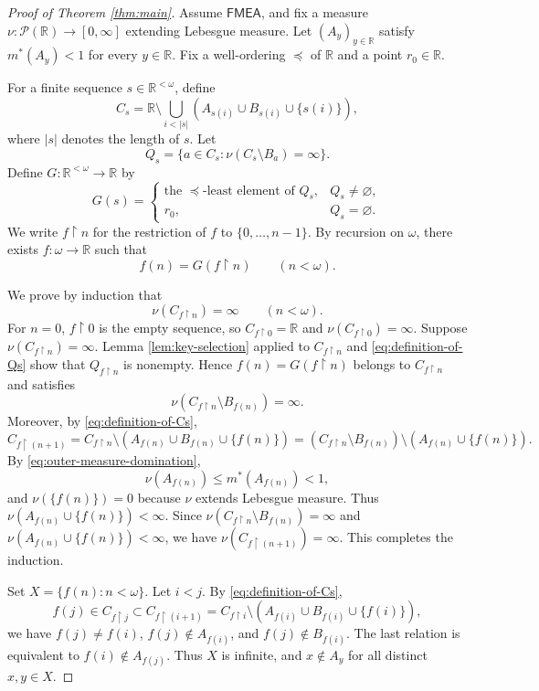 \documentclass{amsart}
\theoremstyle{plain}
\theoremstyle{definition}
\newcommand{\R}{\mathbb{R}}
\newcommand{\Pc}{\mathcal{P}}
\newcommand{\FMEA}{\mathsf{FMEA}}
\begin{document}
\begin{proof}[Proof of Theorem \ref{thm:main}]
Assume $\FMEA$, and fix a measure $\nu:\Pc(\R)\to[0,\infty]$ extending Lebesgue measure.
Let $(A_y)_{y\in\R}$ satisfy $m^*(A_y)<1$ for every $y\in\R$.
Fix a well-ordering $\preceq$ of $\R$ and a point $r_0\in\R$.

For a finite sequence $s\in\R^{<\omega}$, define
\begin{equation}\label{eq:definition-of-Cs}
C_s
=
\R\setminus\bigcup_{i<|s|}\left(A_{s(i)}\cup B_{s(i)}\cup\{s(i)\}\right),
\end{equation}
where $|s|$ denotes the length of $s$.
Let
\begin{equation}\label{eq:definition-of-Qs}
Q_s
=
\{a\in C_s:\nu(C_s\setminus B_a)=\infty\}.
\end{equation}
Define $G:\R^{<\omega}\to\R$ by
\[
G(s)=
\begin{cases}
\text{the $\preceq$-least element of $Q_s$}, & Q_s\ne\varnothing,\\
r_0, & Q_s=\varnothing.
\end{cases}
\]
We write $f\upharpoonright n$ for the restriction of $f$ to $\{0,\ldots,n-1\}$.
By recursion on $\omega$, there exists $f:\omega\to\R$ such that
\[
f(n)=G(f\upharpoonright n)
\qquad(n<\omega).
\]

We prove by induction that
\[
\nu(C_{f\upharpoonright n})=\infty
\qquad(n<\omega).
\]
For $n=0$, $f\upharpoonright 0$ is the empty sequence, so $C_{f\upharpoonright 0}=\R$ and $\nu(C_{f\upharpoonright 0})=\infty$.
Suppose $\nu(C_{f\upharpoonright n})=\infty$.
Lemma \ref{lem:key-selection} applied to $C_{f\upharpoonright n}$ and \eqref{eq:definition-of-Qs} show that $Q_{f\upharpoonright n}$ is nonempty.
Hence $f(n)=G(f\upharpoonright n)$ belongs to $C_{f\upharpoonright n}$ and satisfies
\[
\nu(C_{f\upharpoonright n}\setminus B_{f(n)})=\infty.
\]
Moreover, by \eqref{eq:definition-of-Cs},
\[
C_{f\upharpoonright(n+1)}
=
C_{f\upharpoonright n}\setminus\left(A_{f(n)}\cup B_{f(n)}\cup\{f(n)\}\right)
=
(C_{f\upharpoonright n}\setminus B_{f(n)})\setminus\left(A_{f(n)}\cup\{f(n)\}\right).
\]
By \eqref{eq:outer-measure-domination},
\[
\nu(A_{f(n)})\le m^*(A_{f(n)})<1,
\]
and $\nu(\{f(n)\})=0$ because $\nu$ extends Lebesgue measure.
Thus $\nu(A_{f(n)}\cup\{f(n)\})<\infty$.
Since $\nu(C_{f\upharpoonright n}\setminus B_{f(n)})=\infty$ and $\nu(A_{f(n)}\cup\{f(n)\})<\infty$, we have $\nu(C_{f\upharpoonright(n+1)})=\infty$.
This completes the induction.

Set $X=\{f(n):n<\omega\}$.
Let $i<j$.
By \eqref{eq:definition-of-Cs},
\[
f(j)\in C_{f\upharpoonright j}\subset C_{f\upharpoonright(i+1)}
=C_{f\upharpoonright i}\setminus\left(A_{f(i)}\cup B_{f(i)}\cup\{f(i)\}\right),
\]
we have $f(j)\ne f(i)$, $f(j)\notin A_{f(i)}$, and $f(j)\notin B_{f(i)}$.
The last relation is equivalent to $f(i)\notin A_{f(j)}$.
Thus $X$ is infinite, and $x\notin A_y$ for all distinct $x,y\in X$.
\end{proof}
\end{document}
